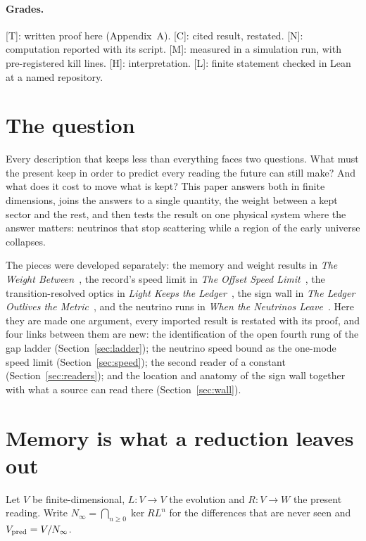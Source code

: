 \documentclass[11pt]{article}
\theoremstyle{definition}
\newcommand{\grade}[1]{\textsf{\small[#1]}}
\begin{document}
\paragraph{Grades.} \grade{T}: written proof here (Appendix~A). \grade{C}: cited result, restated. \grade{N}: computation reported with its script. \grade{M}: measured in a simulation run, with pre-registered kill lines. \grade{H}: interpretation. \grade{L}: finite statement checked in Lean at a named repository.

\section{The question}

Every description that keeps less than everything faces two questions. What must the present keep in order to predict every reading the future can still make? And what does it cost to move what is kept? This paper answers both in finite dimensions, joins the answers to a single quantity, the weight between a kept sector and the rest, and then tests the result on one physical system where the answer matters: neutrinos that stop scattering while a region of the early universe collapses.

The pieces were developed separately: the memory and weight results in \emph{The Weight Between}~\cite{WB}, the record's speed limit in \emph{The Offset Speed Limit}~\cite{OSL}, the transition-resolved optics in \emph{Light Keeps the Ledger}~\cite{LKL}, the sign wall in \emph{The Ledger Outlives the Metric}~\cite{GLO}, and the neutrino runs in \emph{When the Neutrinos Leave}~\cite{NL}. Here they are made one argument, every imported result is restated with its proof, and four links between them are new: the identification of the open fourth rung of the gap ladder (Section~\ref{sec:ladder}); the neutrino speed bound as the one-mode speed limit (Section~\ref{sec:speed}); the second reader of a constant (Section~\ref{sec:readers}); and the location and anatomy of the sign wall together with what a source can read there (Section~\ref{sec:wall}).

\section{Memory is what a reduction leaves out}\label{sec:memory}

Let $V$ be finite-dimensional, $L:V\to V$ the evolution and $R:V\to W$ the present reading. Write $N_\infty=\bigcap_{n\ge0}\ker RL^n$ for the differences that are never seen and $V_{\rm pred}=V/N_\infty$.
\end{document}
